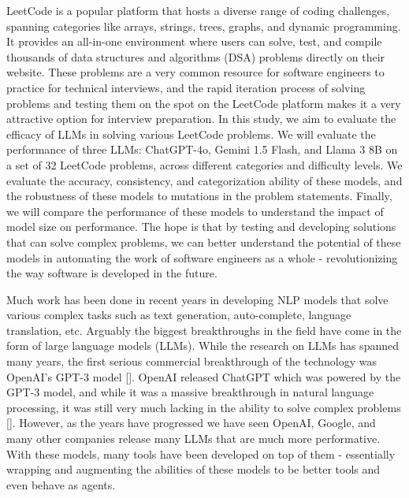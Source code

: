 \documentclass[times, 10pt,twocolumn]{article}
\begin{document}
LeetCode is a popular platform that hosts a diverse range of coding challenges, spanning categories like arrays, strings, trees, graphs, and dynamic programming. It provides an all-in-one environment where users can solve, test, and compile thousands of data structures and algorithms (DSA) problems directly on their website. These problems are a very common resource for software engineers to practice for technical interviews, and the rapid iteration process of solving problems and testing them on the spot on the LeetCode platform makes it a very attractive option for interview preparation. In this study, we aim to evaluate the efficacy of LLMs in solving various LeetCode problems. We will evaluate the performance of three LLMs: ChatGPT-4o, Gemini 1.5 Flash, and Llama 3 8B on a set of 32 LeetCode problems, across different categories and difficulty levels. We evaluate the accuracy, consistency, and categorization ability of these models, and the robustness of these models to mutations in the problem statements. Finally, we will compare the performance of these models to understand the impact of model size on performance. The hope is that by testing and developing solutions that can solve complex problems, we can better understand the potential of these models in automating the work of software engineers as a whole - revolutionizing the way software is developed in the future.



Much work has been done in recent years in developing NLP models that solve various complex tasks such as text generation, auto-complete, language translation, etc. Arguably the biggest breakthroughs in the field have come in the form of large language models (LLMs). While the research on LLMs has spanned many years, the first serious commercial breakthrough of the technology was OpenAI's GPT-3 model []. OpenAI released ChatGPT which was powered by the GPT-3 model, and while it was a massive breakthrough in natural language processing, it was still very much lacking in the ability to solve complex problems []. However, as the years have progressed we have seen OpenAI, Google, and many other companies release many LLMs that are much more performative. With these models, many tools have been developed on top of them - essentially wrapping and augmenting the abilities of these models to be better tools and even behave as agents.
\end{document}
